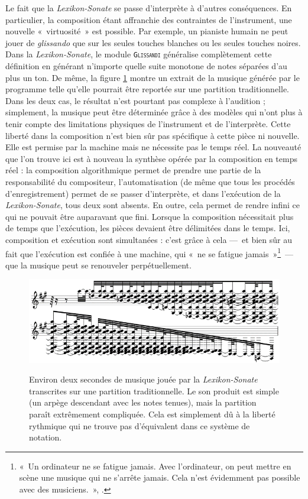 \documentclass[a4paper,12pt]{article}
\newcommand{\guill}[1]{«~#1~»}
\begin{document}
Le fait que la \emph{Lexikon-Sonate} se passe d'interprète à d'autres conséquences. En particulier, la composition étant affranchie des contraintes de l'instrument, une nouvelle \guill{virtuosité} est possible. Par exemple, un pianiste humain ne peut jouer de \emph{glissando} que sur les seules touches blanches ou les seules touches noires. Dans la \emph{Lexikon-Sonate}, le module \texttt{\textsc{Glissandi}} généralise complètement cette définition en générant n'importe quelle suite monotone de notes séparées d'au plus un ton. De même, la figure \ref{partitionls} montre un extrait de la musique générée par le programme telle qu'elle pourrait être reportée sur une partition traditionnelle. Dans les deux cas, le résultat n'est pourtant pas complexe à l'audition ; simplement, la musique peut être déterminée grâce à des modèles qui n'ont plus à tenir compte des limitations physiques de l'instrument et de l'interprète. Cette liberté dans la composition n'est bien sûr pas spécifique à cette pièce ni nouvelle. Elle est permise par la machine mais ne nécessite pas le temps réel. La nouveauté que l'on trouve ici est à nouveau la synthèse opérée par la composition en temps réel : la composition algorithmique permet de prendre une partie de la responsabilité du compositeur, l'automatisation (de même que tous les procédés d'enregistrement) permet de se passer d'interprète, et dans l'exécution de la \emph{Lexikon-Sonate}, tous deux sont absents. En outre, cela permet de rendre infini ce qui ne pouvait être auparavant que fini. Lorsque la composition nécessitait plus de temps que l'exécution, les pièces devaient être délimitées dans le temps. Ici, composition et exécution sont simultanées : c'est grâce à cela ---~et bien sûr au fait que l'exécution est confiée à une machine, qui \guill{ne se fatigue jamais}\footnote{\guill{Un ordinateur ne se fatigue jamais. Avec l'ordinateur, on peut mettre en scène une musique qui ne s'arrête jamais. Cela n'est évidemment pas possible avec des musiciens.}, \cite{pagano}.}~--- que la musique peut se renouveler perpétuellement.

\begin{figure}[h!]
\begin{center}
\includegraphics[width=12cm]{images/partitionls.png}
\label{partitionls}
\caption{\footnotesize Environ deux secondes de musique jouée par la \emph{Lexikon-Sonate} transcrites sur une partition traditionnelle. Le son produit est simple (un arpège descendant avec les notes tenues), mais la partition paraît extrêmement compliquée. Cela est simplement dû à la liberté rythmique qui ne trouve pas d'équivalent dans ce système de notation.}
\end{center}
\end{figure}
\end{document}

